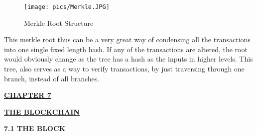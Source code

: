 \documentclass[12pt,a4paper]{report}
\begin{document}
\begin{flushleft}
\vspace{10mm}
\begin{figure}[h]
\centering
\caption{Merkle Root Structure}
\texttt{[image: pics/Merkle.JPG]}
\end{figure}
\vspace{10mm}
\newline
This merkle root thus can be a very great way of condensing all the transactions into one single fixed length hash. If any of the transactions are altered, the root would obviously change as the tree has a hash as the inputs in higher levels. This tree, also serves as a way to verify transactions, by just traversing through one branch, instead of all branches.

\newpage


\begin{center}\underline{ \Large \textbf{CHAPTER 7}}\end{center}
\begin{center}\underline{ \Large \textbf{THE BLOCKCHAIN}}\end{center}
\vspace{10mm}
\textbf{7.1 THE BLOCK}
\vspace{10mm}


\end{flushleft}
\end{document}
